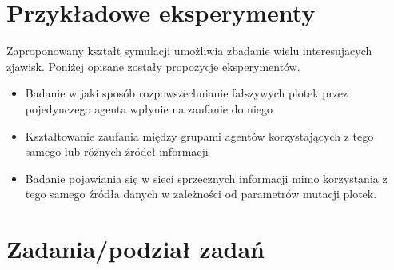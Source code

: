 \documentclass{article}
\begin{document}
	\section{Przykładowe eksperymenty}
	Zaproponowany kształt symulacji umożliwia zbadanie wielu interesujacych zjawisk. Poniżej opisane zostały propozycje eksperymentów.
	\begin{itemize}
	\item Badanie w jaki sposób rozpowszechnianie fałszywych plotek przez pojedynczego agenta wpłynie na zaufanie do niego
	\item Kształtowanie zaufania między grupami agentów korzystających z tego samego lub różnych źródeł informacji
	\item Badanie pojawiania się w sieci sprzecznych informacji mimo korzystania z tego samego źródła danych w zależności od parametrów mutacji plotek.
	\end{itemize}
	\section{Zadania/podział zadań}
\end{document}
